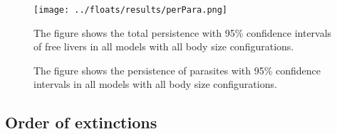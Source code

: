 \documentclass[11pt]{amsart}
\begin{document}
\begin{figure}[h]
\captionsetup[subfigure]{labelfont = it, textfont = it,labelformat = parens,labelsep = space}
    \begin{minipage}{.45\textwidth}
    \end{minipage}
    \begin{minipage}{.45\textwidth}
    \end{minipage}
    \texttt{[image: ../floats/results/perPara.png]}
\caption{The figure shows the total persistence with 95\% confidence intervals of free livers in all models with all body size configurations.}
    \begin{minipage}{.45\textwidth}
    \end{minipage}
    \begin{minipage}{.45\textwidth}
    \end{minipage}
\caption{The figure shows the persistence of parasites with 95\% confidence intervals in all models with all body size configurations.}
\label{fig:persistencePara}
\end{figure}


\subsection{Order of extinctions\label{sec:extinctionOrders}}
\end{document}
